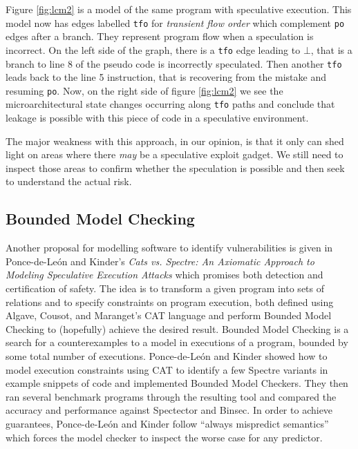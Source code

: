 \documentclass[11pt,conference]{IEEEtran}
\begin{document}
Figure \ref{fig:lcm2} is a model of the same program with speculative execution.
This model now has edges labelled \texttt{tfo} for \emph{transient flow order} which complement \texttt{po} edges after a branch.
They represent program flow when a speculation is incorrect.
On the left side of the graph, there is a \texttt{tfo} edge leading to $\bot$, that is a branch to line 8 of the pseudo code is incorrectly speculated.
Then another \texttt{tfo} leads back to the line 5 instruction, that is recovering from the mistake and resuming \texttt{po}.
Now, on the right side of figure \ref{fig:lcm2} we see the microarchitectural state changes occurring along \texttt{tfo} paths and conclude that leakage is possible with this piece of code in a speculative environment.

The major weakness with this approach, in our opinion, is that it only can shed light on areas where there \emph{may} be a speculative exploit gadget.
We still need to inspect those areas to confirm whether the speculation is possible and then seek to understand the actual risk.

\subsection{Bounded Model Checking}

Another proposal for modelling software to identify vulnerabilities is given in Ponce-de-León and Kinder's \textit{Cats vs. Spectre: An Axiomatic Approach to Modeling Speculative Execution Attacks}\cite{cats2022} which promises both detection and certification of safety.
The idea is to transform a given program into sets of relations and to specify constraints on program execution, both defined using Algave, Cousot, and Maranget's CAT language\cite{alglave2016syntax} and perform Bounded Model Checking\cite{biere2021BoundedMC} to (hopefully) achieve the desired result.
Bounded Model Checking is a search for a counterexamples to a model in executions of a program, bounded by some total number of executions.
Ponce-de-León and Kinder showed how to model execution constraints using CAT to identify a few Spectre variants in example snippets of code and implemented Bounded Model Checkers.
They then ran several benchmark programs through the resulting tool and compared the accuracy and performance against Spectector and Binsec. 
In order to achieve guarantees, Ponce-de-León and Kinder follow ``always mispredict semantics'' which forces the model checker to inspect the worse case for any predictor.
\end{document}

